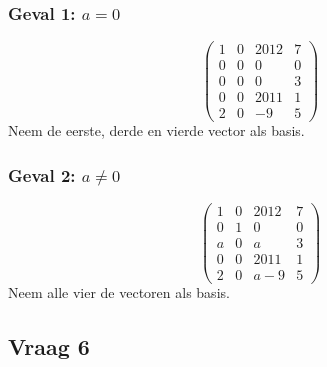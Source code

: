 \documentclass[lineaire_algebra_oplossingen.tex]{subfiles}
\begin{document}
\subsubsection*{Geval 1: $a=0$}
\[
\begin{pmatrix}
1 & 0 & 2012 & 7\\
0 & 0 & 0 & 0\\
0 & 0 & 0 & 3\\
0 & 0 & 2011 & 1\\
2 & 0 & -9 & 5
\end{pmatrix}
\]
Neem de eerste, derde en vierde vector als basis.

\subsubsection*{Geval 2: $a\neq0$}
\[
\begin{pmatrix}
1 & 0 & 2012 & 7\\
0 & 1 & 0 & 0\\
a & 0 & a & 3\\
0 & 0 & 2011 & 1\\
2 & 0 & a-9 & 5
\end{pmatrix}
\]
Neem alle vier de vectoren als basis.

\subsection{Vraag 6}
\end{document}
